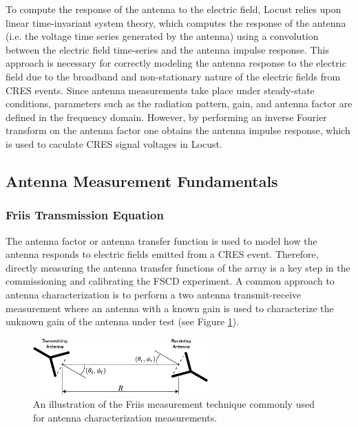 To compute the response of the antenna to the electric field, Locust relies upon linear time-invariant system theory, which computes the response of the antenna (i.e. the voltage time series generated by the antenna) using a convolution between the electric field time-series and the antenna impulse response. This approach is necessary for correctly modeling the antenna response to the electric field due to the broadband and non-stationary nature of the electric fields from CRES events. Since antenna measurements take place under steady-state conditions, parameters such as the radiation pattern, gain, and antenna factor are defined in the frequency domain. However, by performing an inverse Fourier transform on the antenna factor one obtains the antenna impulse response, which is used to caculate CRES signal voltages in Locust.

\subsection{Antenna Measurement Fundamentals}
\subsubsection{Friis Transmission Equation}

The antenna factor or antenna transfer function is used to model how the antenna responds to electric fields emitted from a CRES event. Therefore, directly measuring the antenna transfer functions of the array is a key step in the commissioning and calibrating the FSCD experiment. A common approach to antenna characterization is to perform a two antenna transmit-receive measurement where an antenna with a known gain is used to characterize the unknown gain of the antenna under test (see Figure \ref{fig:friis-meas}). 
\begin{figure}[htbp]
    \centering
    \includegraphics[width=0.6\textwidth]{figs/Chapter-5/230409_friis_figure.png}
    \caption{An illustration of the Friis measurement technique commonly used for antenna characterization measurements.}
    \label{fig:friis-meas}
\end{figure}

